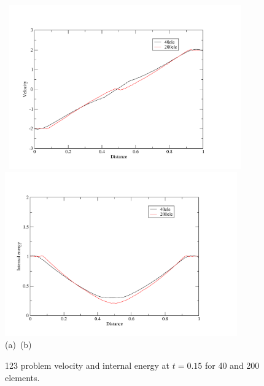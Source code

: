 \begin{figure}[H]
\vbox{
\hbox{
\hspace{-1.cm}
\includegraphics[width=10.0cm]{./doc_figures/shock/velocity-123prob}
\hspace{-1.cm}
\includegraphics[width=10.0cm]{./doc_figures/shock/int_energy-123prob}
}
\vspace{-0.cm}
\hbox{\hspace{4.cm}(a) \hspace{4.5cm}(b)}
\vspace{-0.cm}}
\label{123-prob-ve}
\caption{ 123 problem velocity and internal energy 
at $t=0.15$ for 40 and 200 elements. }
\end{figure}



